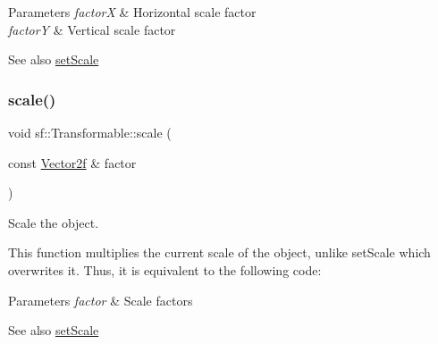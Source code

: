 \begin{DoxyParams}{Parameters}
{\em factorX} & Horizontal scale factor \\
\hline
{\em factorY} & Vertical scale factor\\
\hline
\end{DoxyParams}
\begin{DoxySeeAlso}{See also}
\mbox{\hyperlink{classsf_1_1_transformable_aaec50b46b3f41b054763304d1e727471}{set\+Scale}} \begin{DoxyVerb}\end{DoxyVerb}
 
\end{DoxySeeAlso}
\mbox{\label{classsf_1_1_transformable_adecaa6c69b1f27dd5194b067d96bb694}} 
\subsubsection{\texorpdfstring{scale()}{scale()}\hspace{0.1cm}{\footnotesize\ttfamily [2/2]}}
{\footnotesize\ttfamily void sf\+::\+Transformable\+::scale (\begin{DoxyParamCaption}\item[{const \mbox{\hyperlink{classsf_1_1_vector2}{Vector2f}} \&}]{factor }\end{DoxyParamCaption})}



Scale the object. 

This function multiplies the current scale of the object, unlike set\+Scale which overwrites it. Thus, it is equivalent to the following code\+: 
\begin{DoxyCode}{0}
\end{DoxyCode}



\begin{DoxyParams}{Parameters}
{\em factor} & Scale factors\\
\hline
\end{DoxyParams}
\begin{DoxySeeAlso}{See also}
\mbox{\hyperlink{classsf_1_1_transformable_aaec50b46b3f41b054763304d1e727471}{set\+Scale}} \begin{DoxyVerb}\end{DoxyVerb}
 
\end{DoxySeeAlso}
\mbox{\label{classsf_1_1_transformable_a56c67bd80aae8418d13fb96c034d25ec}} 
